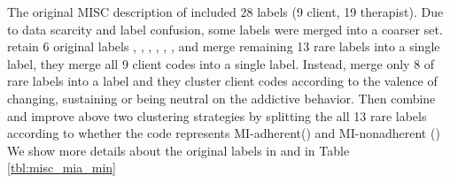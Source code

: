 The original MISC description of \citet{miller2003manual} included 28
labels (9 client, 19 therapist). Due to data scarcity and label
confusion, some labels were merged into a coarser set.
\citet{can2015dialog} retain 6 original labels \FA, \GI, \QUC, \QUO,
\REC, \RES, and merge remaining 13 rare labels into a single
 label, they merge all 9 client codes into a single
 label.  Instead, \citet{tanana2016comparison} merge only 8
of rare labels into a  label and they cluster client codes
according to the valence of changing, sustaining or being neutral on
the addictive behavior\cite{atkins2014scaling}. Then
\citet{xiao2016behavioral} combine and improve above two clustering
strategies by splitting the all 13 rare labels according to whether
the code represents MI-adherent(\MIA) and MI-nonadherent (\MIN) We
show more details about the original labels in \MIA and \MIN in Table
\ref{tbl:misc_mia_min}
